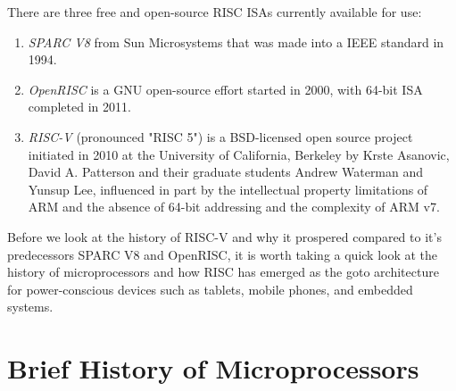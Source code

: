 \documentclass[journal]{IEEEtran}
\begin{document}
There are three free and open-source RISC ISAs currently available for use\cite{asanovic_instruction_2014}:
\begin{enumerate}
    \item \emph{SPARC V8} from Sun Microsystems that was made into a IEEE standard in 1994.
    \item \emph{OpenRISC} is a GNU open-source effort started in 2000, with 64-bit ISA completed in 2011.
    \item \emph{RISC-V} (pronounced "RISC 5") is a BSD-licensed open source project initiated in 2010 at the University of California, Berkeley by Krste Asanovic, David A. Patterson and their graduate students Andrew Waterman and Yunsup Lee, influenced in part by the intellectual property limitations of ARM and the absence of 64-bit addressing and the complexity of ARM v7.
\end{enumerate}

Before we look at the history of RISC-V and why it prospered compared to it's predecessors SPARC V8 and OpenRISC, it is worth taking a quick look at the history of microprocessors and how RISC has emerged as the goto architecture for power-conscious devices such as tablets, mobile phones, and embedded systems.

\section{Brief History of Microprocessors}
\end{document}
